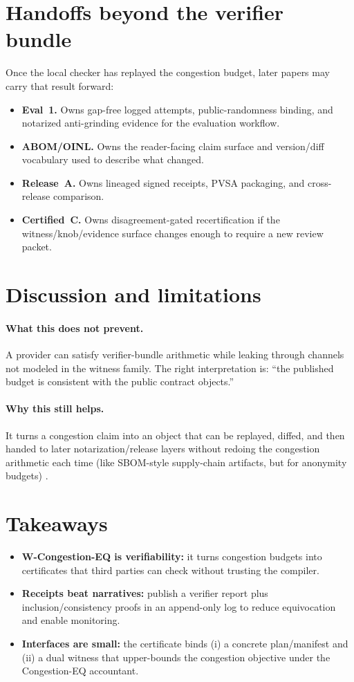 \documentclass[11pt]{article}
\begin{document}
\section{Handoffs beyond the verifier bundle}
Once the local checker has replayed the congestion budget, later papers may carry that result forward:
\begin{itemize}[leftmargin=1.2em]
\item \textbf{Eval~1.} Owns gap-free logged attempts, public-randomness binding, and notarized anti-grinding evidence for the evaluation workflow.\cite{series:evalnotary}
\item \textbf{ABOM/OINL.} Owns the reader-facing claim surface and version/diff vocabulary used to describe what changed.\cite{series:abom}
\item \textbf{Release~A.} Owns lineaged signed receipts, PVSA packaging, and cross-release comparison.\cite{series:release}
\item \textbf{Certified~C.} Owns disagreement-gated recertification if the witness/knob/evidence surface changes enough to require a new review packet.\cite{series:recert}
\end{itemize}
\section{Discussion and limitations}
\paragraph{What this does not prevent.}
A provider can satisfy verifier-bundle arithmetic while leaking through channels not modeled in the witness family.
The right interpretation is: ``the published budget is consistent with the public contract objects.''
\paragraph{Why this still helps.}
It turns a congestion claim into an object that can be replayed, diffed, and then handed to later notarization/release layers without redoing the congestion arithmetic each time (like SBOM-style supply-chain artifacts, but for anonymity budgets) \cite{torresarias_intoto_sec19,sigstore_acm2022,slsa_v1}.

\section{Takeaways}
\begin{itemize}[leftmargin=*]
\item \textbf{W-Congestion-EQ is verifiability:} it turns congestion budgets into certificates that third parties can check without trusting the compiler.
\item \textbf{Receipts beat narratives:} publish a verifier report plus inclusion/consistency proofs in an append-only log to reduce equivocation and enable monitoring.
\item \textbf{Interfaces are small:} the certificate binds (i) a concrete plan/manifest and (ii) a dual witness that upper-bounds the congestion objective under the Congestion-EQ accountant.
\end{itemize}
\end{document}
